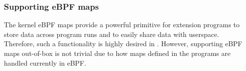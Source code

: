 \subsubsection{Supporting eBPF maps}
\label{impl:crate:map}
%
%
The kernel eBPF maps provide a powerful primitive for extension programs to
    store data across program runs and to easily share data with userspace.
Therefore, such a functionality is highly desired in \projname{}.
However, supporting eBPF maps out-of-box is not trivial due to how maps defined
    in the programs are handled currently in eBPF.

